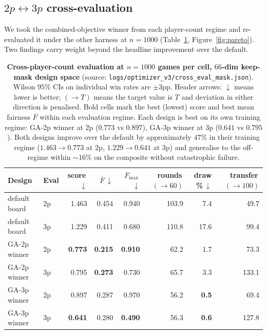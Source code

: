 \documentclass[10pt]{article}
\begin{document}
\subsection{$2p\!\leftrightarrow\!3p$ cross-evaluation}\label{sec:cross}

We took the combined-objective winner from each player-count regime
and re-evaluated it under the other harness at $n{=}1000$
(Table~\ref{tab:cross}, Figure~\ref{fig:pareto}). Two findings carry
weight beyond the headline improvement over the default.

\begin{table}[h!]
\centering
\small
\begin{tabular}{llrrrrrr}
\toprule
Design & Eval & score\,$\downarrow$ & $\overline{F}$\,$\downarrow$ & $F_{\max}$\,$\downarrow$ & rounds\,$(\!\to\!60)$ & draw \%\,$\downarrow$ & transfer\,$(\!\to\!100)$ \\
\midrule
default board    & 2p & 1.463 & 0.454 & 0.940 & 103.9 &  7.4 &  49.7 \\
default board    & 3p & 1.229 & 0.411 & 0.680 & 110.8 & 17.6 &  99.4 \\
\addlinespace
GA-2p winner     & 2p & \textbf{0.773} & \textbf{0.215} & \textbf{0.910} &  62.2 &  1.7 &  73.3 \\
GA-2p winner     & 3p & 0.795 & \textbf{0.273} & 0.730 &  65.7 &  3.3 & 133.1 \\
\addlinespace
GA-3p winner     & 2p & 0.897 & 0.287 & 0.970 &  56.2 &  \textbf{0.5} &  69.4 \\
GA-3p winner     & 3p & \textbf{0.641} & 0.280 & \textbf{0.490} &  56.3 &  \textbf{0.6} & 127.8 \\
\bottomrule
\end{tabular}
\caption{\textbf{Cross-player-count evaluation at $n{=}1000$ games
per cell, $66$-dim keep-mask design space} (source:
\texttt{logs/optimizer\_v3/cross\_eval\_mask.json}). Wilson $95\%$
CIs on individual win rates are $\pm 3$pp. Header arrows:
$\downarrow$ means lower is better; $(\!\to\!T)$ means the target
value is $T$ and deviation in either direction is penalised. Bold
cells mark the best (lowest) score and best mean fairness
$\overline{F}$ within each evaluation regime. Each design is best
on its own training regime: GA-2p winner at 2p
($0.773$ vs $0.897$), GA-3p winner at 3p ($0.641$ vs $0.795$). Both
designs improve over the default by approximately $47\%$ in their
training regime ($1.463 \!\to\! 0.773$ at 2p, $1.229 \!\to\! 0.641$
at 3p) and generalise to the off-regime within $\sim 16\%$ on the
composite without catastrophic failure.}
\label{tab:cross}
\end{table}
\end{document}
